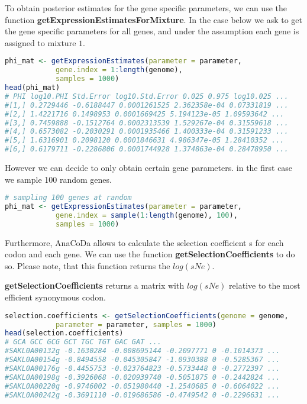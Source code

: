 To obtain posterior estimates for the gene specific parameters, we can use the function \textbf{getExpressionEstimatesForMixture}.
In the case below we ask to get the gene specific parameters for all genes, and under the assumption each gene is assigned to mixture $1$.

\begin{lstlisting}[language=R]
phi_mat <- getExpressionEstimates(parameter = parameter,
			gene.index = 1:length(genome),
			samples = 1000)
head(phi_mat)
# PHI log10.PHI Std.Error log10.Std.Error 0.025 0.975 log10.025 ...
#[1,] 0.2729446 -0.6188447 0.0001261525 2.362358e-04 0.07331819 ...
#[2,] 1.4221716 0.1498953 0.0001669425 5.194123e-05 1.09593642 ...
#[3,] 0.7459888 -0.1512764 0.0002313539 1.529267e-04 0.31559618 ...
#[4,] 0.6573082 -0.2030291 0.0001935466 1.400333e-04 0.31591233 ...
#[5,] 1.6316901 0.2098120 0.0001846631 4.986347e-05 1.28410352 ...
#[6,] 0.6179711 -0.2286806 0.0001744928 1.374863e-04 0.28478950 ...
\end{lstlisting}

However we can decide to only obtain certain gene parameters. in the first case we sample 100 random genes.

\begin{lstlisting}[language=R]
# sampling 100 genes at random
phi_mat <- getExpressionEstimates(parameter = parameter,
			gene.index = sample(1:length(genome), 100),
			samples = 1000)
\end{lstlisting}

Furthermore, AnaCoDa allows to calculate the selection coefficient s for each codon and each gene. We can
use the function \textbf{getSelectionCoefficients} to do so. Please note, that this function returns the $log(sNe)$.

\textbf{getSelectionCoefficients} returns a matrix with $log(sNe)$ relative to the most efficient synonymous codon.

\begin{lstlisting}[language=R]
selection.coefficients <- getSelectionCoefficients(genome = genome,
			parameter = parameter, samples = 1000)
head(selection.coefficients)
# GCA GCC GCG GCT TGC TGT GAC GAT ...
#SAKL0A00132g -0.1630284 -0.008695144 -0.2097771 0 -0.1014373 ...
#SAKL0A00154g -0.8494558 -0.045305847 -1.0930388 0 -0.5285367 ...
#SAKL0A00176g -0.4455753 -0.023764823 -0.5733448 0 -0.2772397 ...
#SAKL0A00198g -0.3926068 -0.020939740 -0.5051875 0 -0.2442824 ...
#SAKL0A00220g -0.9746002 -0.051980440 -1.2540685 0 -0.6064022 ...
#SAKL0A00242g -0.3691110 -0.019686586 -0.4749542 0 -0.2296631 ...
\end{lstlisting}

